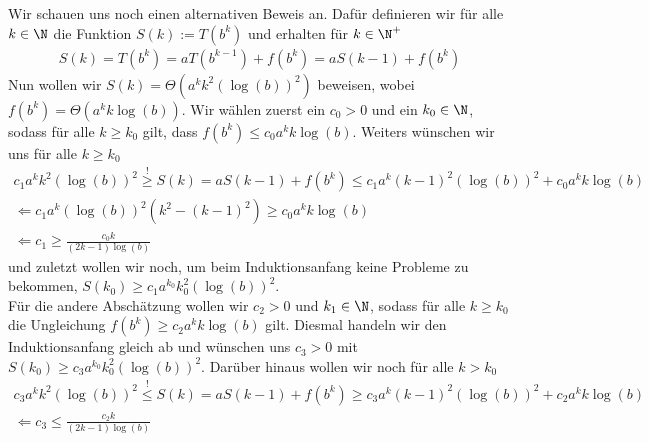\begin{solution}
	Wir schauen uns noch einen alternativen Beweis an. Dafür definieren wir für alle $k \in \N$ die Funktion $S(k) := T(b^k)$ und erhalten für $k \in \N^+$
	\begin{align*}
	S(k) = T(b^k) = aT(b^{k-1}) + f(b^k) = a S(k-1) + f(b^k)
	\end{align*}
	Nun wollen wir $S(k) = \Theta(a^k k^2 (\log(b))^2)$ beweisen, wobei $f(b^k) = \Theta(a^k k\log(b))$. Wir wählen zuerst ein $c_0 > 0$ und ein $k_0 \in \N$, sodass für alle $k \geq k_0$ gilt, dass $f(b^k) \leq c_0 a^k k \log(b)$. Weiters wünschen wir uns für alle $k \geq k_0$
	\begin{align*}
	c_1 a^k k^2 (\log(b))^2 \stackrel{!}{\geq} S(k) = a S(k-1) + f(b^k) \leq  c_1 a^k (k - 1)^2 (\log(b))^2 + c_0 a^k k \log(b) \\
	\Leftarrow c_1 a^k (\log(b))^2( k^2 - (k -1)^2) \geq c_0 a^k k \log(b) \\
	\Leftarrow c_1 \geq \frac{c_0 k}{(2k -1) \log(b)}
	\end{align*}
	und zuletzt wollen wir noch, um beim Induktionsanfang keine Probleme zu bekommen, $S(k_0) \geq c_1 a^{k_0} k_0^2 (\log(b))^2$. \\
	Für die andere Abschätzung wollen wir $c_2 > 0$ und $k_1 \in \N$, sodass für alle $k \geq k_0$ die Ungleichung $f(b^k) \geq c_2 a^k k \log(b)$ gilt. Diesmal handeln wir den Induktionsanfang gleich ab und wünschen uns $c_3 > 0$ mit $S(k_0) \geq c_3 a^{k_0} k_0^2 (\log(b))^2 $. Darüber hinaus wollen wir noch für alle $k > k_0$
	\begin{align*}
	c_3 a^k k^2 (\log(b))^2 \stackrel{!}{\leq} S(k) = a S(k-1) + f(b^k) \geq c_3 a^k (k - 1)^2 (\log(b))^2 + c_2 a^k k \log(b) \\
	\Leftarrow c_3 \leq \frac{c_2 k}{(2k - 1) \log(b)}
	\end{align*}
\end{solution}

